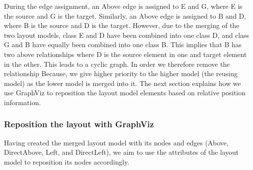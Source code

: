 During the edge assignment, an Above edge is assigned to E and G, where E is the source and G is the target. Similarly, an Above edge is assigned to B and D, where B is the source and D is the target. However, due to the merging of the two layout models, class E and D have been combined into one class D, and class G and B have equally been combined into one class B. This implies that B has two above relationships where D is the source element in one and target element in the other. This leads to a cyclic graph. In order    we therefore remove the relationship  Because, we give higher priority to the higher model (the reusing model) as the lower model is merged into it. The next section explains how we use GraphViz to reposition the layout model elements based on relative position information.

\subsubsection{Reposition the layout with GraphViz}
Having created the merged layout model with its nodes and edges (Above, DirectAbove, Left, and DirectLeft), we aim to use the attributes of the layout model to reposition its nodes accordingly. 

